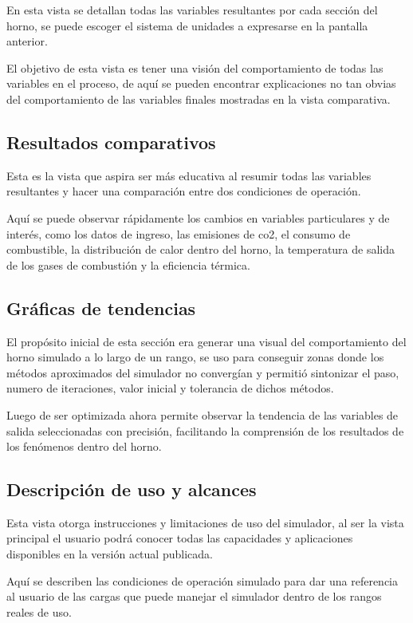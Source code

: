 \par En esta vista se detallan todas las variables resultantes por cada sección del horno, se puede escoger el sistema de unidades a expresarse en la pantalla anterior.
\par El objetivo de esta vista es tener una visión del comportamiento de todas las variables en el proceso, de aquí se pueden encontrar explicaciones no tan obvias del comportamiento de las variables finales mostradas en la vista comparativa.

\subsection{Resultados comparativos}

\par Esta es la vista que aspira ser más educativa al resumir todas las variables resultantes y hacer una comparación entre dos condiciones de operación.
\par Aquí se puede observar rápidamente los cambios en variables particulares y de interés, como los datos de ingreso, las emisiones de \ac{co2}, el consumo de combustible, la distribución de calor dentro del horno, la temperatura de salida de los gases de combustión y la eficiencia térmica.

\subsection{Gráficas de tendencias}

\par El propósito inicial de esta sección era generar una visual del comportamiento del horno simulado a lo largo de un rango, se uso para conseguir zonas donde los métodos aproximados del simulador no convergían y permitió sintonizar el paso, numero de iteraciones, valor inicial y tolerancia de dichos métodos.
\par Luego de ser optimizada ahora permite observar la tendencia de las variables de salida seleccionadas con precisión, facilitando la comprensión de los resultados de los fenómenos dentro del horno.

\subsection{Descripción de uso y alcances}

\par Esta vista otorga instrucciones y limitaciones de uso del simulador, al ser la vista principal el usuario podrá conocer todas las capacidades y aplicaciones disponibles en la versión actual publicada.
\par Aquí se describen las condiciones de operación simulado para dar una referencia al usuario de las cargas que puede manejar el simulador dentro de los rangos reales de uso.

